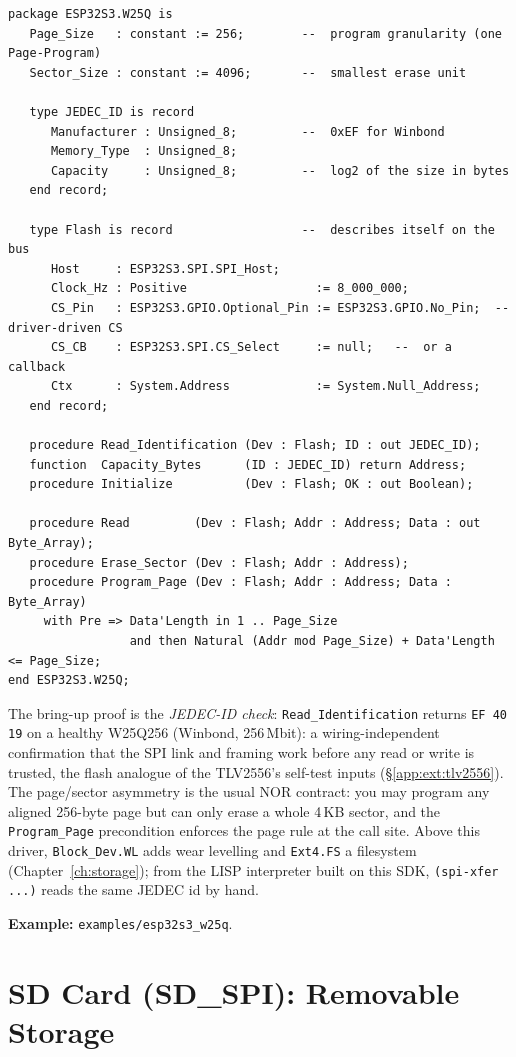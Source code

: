 \begin{lstlisting}
package ESP32S3.W25Q is
   Page_Size   : constant := 256;        --  program granularity (one Page-Program)
   Sector_Size : constant := 4096;       --  smallest erase unit

   type JEDEC_ID is record
      Manufacturer : Unsigned_8;         --  0xEF for Winbond
      Memory_Type  : Unsigned_8;
      Capacity     : Unsigned_8;         --  log2 of the size in bytes
   end record;

   type Flash is record                  --  describes itself on the bus
      Host     : ESP32S3.SPI.SPI_Host;
      Clock_Hz : Positive                  := 8_000_000;
      CS_Pin   : ESP32S3.GPIO.Optional_Pin := ESP32S3.GPIO.No_Pin;  -- driver-driven CS
      CS_CB    : ESP32S3.SPI.CS_Select     := null;   --  or a callback
      Ctx      : System.Address            := System.Null_Address;
   end record;

   procedure Read_Identification (Dev : Flash; ID : out JEDEC_ID);
   function  Capacity_Bytes      (ID : JEDEC_ID) return Address;
   procedure Initialize          (Dev : Flash; OK : out Boolean);

   procedure Read         (Dev : Flash; Addr : Address; Data : out Byte_Array);
   procedure Erase_Sector (Dev : Flash; Addr : Address);
   procedure Program_Page (Dev : Flash; Addr : Address; Data : Byte_Array)
     with Pre => Data'Length in 1 .. Page_Size
                 and then Natural (Addr mod Page_Size) + Data'Length <= Page_Size;
end ESP32S3.W25Q;
\end{lstlisting}

The bring-up proof is the \emph{JEDEC-ID check}: \texttt{Read\_Identification}
returns \texttt{EF 40 19} on a healthy W25Q256 (Winbond, 256\,Mbit): a
wiring-independent confirmation that the SPI link and framing work before any read
or write is trusted, the flash analogue of the TLV2556's self-test inputs
(\S\ref{app:ext:tlv2556}). The page/sector asymmetry is the usual NOR contract: you
may program any aligned 256-byte page but can only erase a whole 4\,KB sector, and
the \texttt{Program\_Page} precondition enforces the page rule at the call site.
Above this driver, \texttt{Block\_Dev.WL} adds wear levelling and \texttt{Ext4.FS} a
filesystem (Chapter~\ref{ch:storage}); from the LISP interpreter built
on this SDK, \texttt{(spi-xfer ...)} reads the same JEDEC id by hand.

\noindent\textbf{Example:} \texttt{examples/esp32s3\_w25q}.

\section{SD Card (SD\_SPI): Removable Storage}
\label{app:ext:sdspi}

